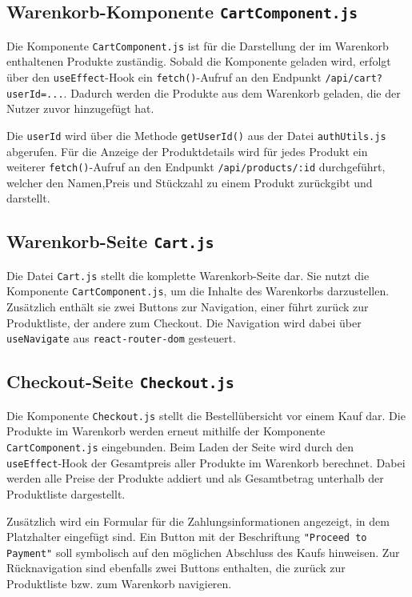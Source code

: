 \documentclass[oneside]{ausarbeitung}
\begin{document}
\subsection{Warenkorb-Komponente \texttt{CartComponent.js}} 

Die Komponente \texttt{CartComponent.js} ist für die Darstellung der im Warenkorb enthaltenen Produkte zuständig. Sobald die Komponente geladen wird, erfolgt über den \texttt{useEffect}-Hook ein \texttt{fetch()}-Aufruf an den Endpunkt \texttt{/api/cart?userId=...}. Dadurch werden die Produkte aus dem Warenkorb geladen, die der Nutzer zuvor hinzugefügt hat.

Die \texttt{userId} wird über die Methode \texttt{getUserId()} aus der Datei \texttt{authUtils.js} abgerufen. Für die Anzeige der Produktdetails wird für jedes Produkt ein weiterer \texttt{fetch()}-Aufruf an den Endpunkt \texttt{/api/products/:id} durchgeführt, welcher den Namen,Preis und Stückzahl zu einem Produkt zurückgibt und darstellt.

\subsection{Warenkorb-Seite \texttt{Cart.js}} 

Die Datei \texttt{Cart.js} stellt die komplette Warenkorb-Seite dar.
Sie nutzt die Komponente \texttt{CartComponent.js}, um die Inhalte des Warenkorbs darzustellen. Zusätzlich enthält sie zwei Buttons zur Navigation, einer führt zurück zur Produktliste, der andere zum Checkout. Die Navigation wird dabei über \texttt{useNavigate} aus \texttt{react-router-dom} gesteuert.

\subsection{Checkout-Seite \texttt{Checkout.js}}

Die Komponente \texttt{Checkout.js} stellt die Bestellübersicht vor einem Kauf dar.
Die Produkte im Warenkorb werden erneut mithilfe der Komponente \texttt{CartComponent.js} eingebunden. Beim Laden der Seite wird durch den \texttt{useEffect}-Hook der Gesamtpreis aller Produkte im Warenkorb berechnet. Dabei werden alle Preise der Produkte addiert und als Gesamtbetrag unterhalb der Produktliste dargestellt.

Zusätzlich wird ein Formular für die Zahlungsinformationen angezeigt, in dem Platzhalter eingefügt sind. Ein Button mit der Beschriftung \texttt{"Proceed to Payment"} soll symbolisch auf den möglichen Abschluss des Kaufs hinweisen.
Zur Rücknavigation sind ebenfalls zwei Buttons enthalten, die zurück zur Produktliste bzw. zum Warenkorb navigieren.
\end{document}
